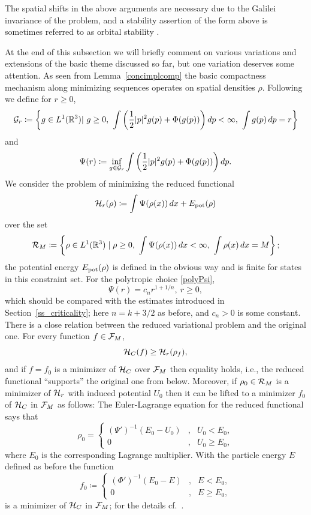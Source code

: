 \documentclass[11pt]{article}
\begin{document}
The spatial shifts in the above arguments are necessary due to the Galilei
invariance of the problem, and a stability assertion of the form above
is sometimes referred to as orbital stability \cite{Mou}.

At the end of this subsection we will briefly comment on various variations
and extensions of the basic theme discussed so far, but one variation deserves
some attention. As seen from Lemma~\ref{concimplcomp} the basic compactness
mechanism along minimizing sequences operates on spatial densities $\rho$.
Following \cite{Rein02} we define for $r \geq 0$,
\[ 
{\cal G}_r \coloneqq\left\{g \in L^1 (\mathbb R^3) |\ g\geq 0,\  
\int\left(\frac{1}{2}|p|^2 g (p) + \Phi(g(p))\right) dp < \infty,\
\int g(p)\, dp = r \right\} 
\]
and
\[ 
\Psi(r)\coloneqq\inf_{g \in {\cal G}_r} 
\int\left(\frac{1}{2}|p|^2 g (p) + \Phi(g(p))\right) dp.
\]
We consider the problem of minimizing the reduced functional
\begin{equation} \label{hcrdef}
  {{\cal H}_r}(\rho)
  \coloneqq
  \int \Psi (\rho(x))\, dx + E_\mathrm{pot} (\rho)
\end{equation}
over the set
\[ 
{\cal R}_M
\coloneqq
\left \{\rho \in L^1(\mathbb R^3) \mid \rho\geq 0,\
\int \Psi (\rho(x))\, dx < \infty ,\ \int \rho (x)\, dx = M 
\right\};
\]
the potential energy $E_\mathrm{pot}(\rho)$ is defined
in the obvious way and is finite for states in this constraint set.
For the polytropic choice \eqref{polyPsi},
\[
\Psi(r) = c_n r^{1+1/n},\ r\geq 0,
\]
which should be compared with the estimates introduced in
Section~\ref{ss_criticality};
here $n=k+3/2$ as before, and $c_n>0$ is some constant.
There is a close relation between the reduced
variational problem and the original one. 
For every function $f \in {\cal F}_M$,
\[
{\cal H}_C(f) \geq {{\cal H}_r}(\rho_f),
\]
and if $f=f_0$ is a minimizer of ${\cal H}_C$ over ${\cal F}_M$ then equality holds,
i.e., the reduced functional ``supports'' the original one from below.
Moreover, if $\rho_0 \in {\cal R}_M$ is a minimizer of ${{\cal H}_r}$ with
induced potential $U_0$ then it can be lifted to a minimizer
$f_0$ of ${\cal H}_C$ in ${\cal F}_M$ as follows: The Euler-Lagrange equation
for the reduced functional says that
\[ 
\rho_0 = \left\{ 
\begin{array}{ccl}
  (\Psi')^{-1}(E_0 - U_0)&,& U_0 < E_0, \\
  0 &,& U_0 \geq E_0, 
\end{array}
\right.
\]
where $E_0$ is the corresponding Lagrange multiplier.
With the particle energy $E$ defined as before the function
\[
f_0
\coloneqq
\left\{ 
\begin{array}{ccl}
  (\Phi')^{-1}(E_0 - E) &,& E < E_0, \\
  0 &,& E \geq E_0, 
\end{array}
\right.
\]  
is a minimizer of ${\cal H}_C$ in ${\cal F}_M$; for the details
cf.~\cite[Theorem~2.1]{Rein07}.
\end{document}
